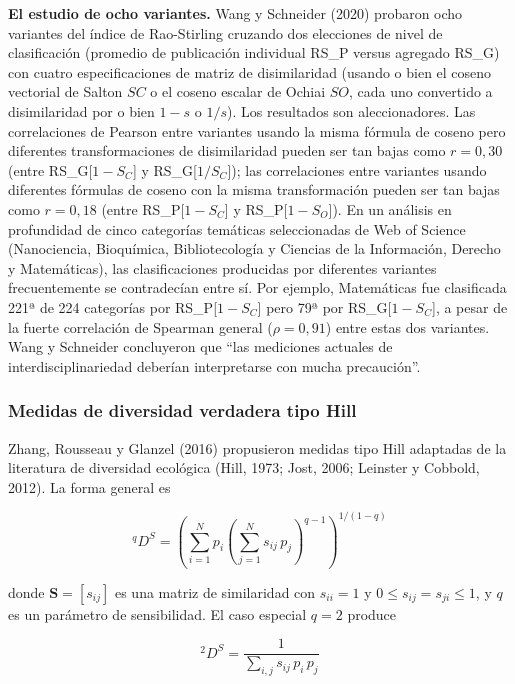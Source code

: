 \documentclass[
]{article}
\begin{document}
\textbf{El estudio de ocho variantes.} Wang y Schneider (2020) probaron
ocho variantes del índice de Rao-Stirling cruzando dos elecciones de
nivel de clasificación (promedio de publicación individual RS\_P versus
agregado RS\_G) con cuatro especificaciones de matriz de disimilaridad
(usando o bien el coseno vectorial de Salton \(SC\) o el coseno escalar
de Ochiai \(SO\), cada uno convertido a disimilaridad por o bien
\(1 - s\) o \(1/s\)). Los resultados son aleccionadores. Las
correlaciones de Pearson entre variantes usando la misma fórmula de
coseno pero diferentes transformaciones de disimilaridad pueden ser tan
bajas como \(r = 0,30\) (entre RS\_G{[}\(1 - S_C\){]} y
RS\_G{[}\(1/S_C\){]}); las correlaciones entre variantes usando
diferentes fórmulas de coseno con la misma transformación pueden ser tan
bajas como \(r = 0,18\) (entre RS\_P{[}\(1 - S_C\){]} y
RS\_P{[}\(1 - S_O\){]}). En un análisis en profundidad de cinco
categorías temáticas seleccionadas de Web of Science (Nanociencia,
Bioquímica, Bibliotecología y Ciencias de la Información, Derecho y
Matemáticas), las clasificaciones producidas por diferentes variantes
frecuentemente se contradecían entre sí. Por ejemplo, Matemáticas fue
clasificada 221ª de 224 categorías por RS\_P{[}\(1 - S_C\){]} pero 79ª
por RS\_G{[}\(1 - S_C\){]}, a pesar de la fuerte correlación de Spearman
general (\(\rho = 0,91\)) entre estas dos variantes. Wang y Schneider
concluyeron que ``las mediciones actuales de interdisciplinariedad
deberían interpretarse con mucha precaución''.

\hypertarget{medidas-de-diversidad-verdadera-tipo-hill}{%
\subsubsection{Medidas de diversidad verdadera tipo
Hill}\label{medidas-de-diversidad-verdadera-tipo-hill}}

Zhang, Rousseau y Glanzel (2016) propusieron medidas tipo Hill adaptadas
de la literatura de diversidad ecológica (Hill, 1973; Jost, 2006;
Leinster y Cobbold, 2012). La forma general es

\[{}^qD^S = \left( \sum_{i=1}^{N} p_i \left( \sum_{j=1}^{N} s_{ij}\, p_j \right)^{q-1} \right)^{1/(1-q)}\]

donde \(\mathbf{S} = [s_{ij}]\) es una matriz de similaridad con
\(s_{ii} = 1\) y \(0 \le s_{ij} = s_{ji} \le 1\), y \(q\) es un
parámetro de sensibilidad. El caso especial \(q = 2\) produce

\[{}^2D^S = \frac{1}{\sum_{i,j} s_{ij}\, p_i\, p_j}\]
\end{document}

